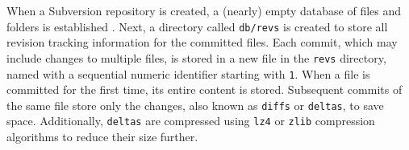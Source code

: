 When a Subversion repository is created, a (nearly) empty database of files and folders is established \cite{stopak_2019}. Next, a directory called \lstinline{db/revs} is created to store all revision tracking information for the committed files. Each commit, which may include changes to multiple files, is stored in a new file in the \lstinline{revs} directory, named with a sequential numeric identifier starting with \lstinline{1}. When a file is committed for the first time, its entire content is stored. Subsequent commits of the same file store only the changes, also known as \lstinline{diffs} or \lstinline{deltas}, to save space. Additionally, \lstinline{deltas} are compressed using \lstinline{lz4} or \lstinline{zlib} compression algorithms to reduce their size further.




